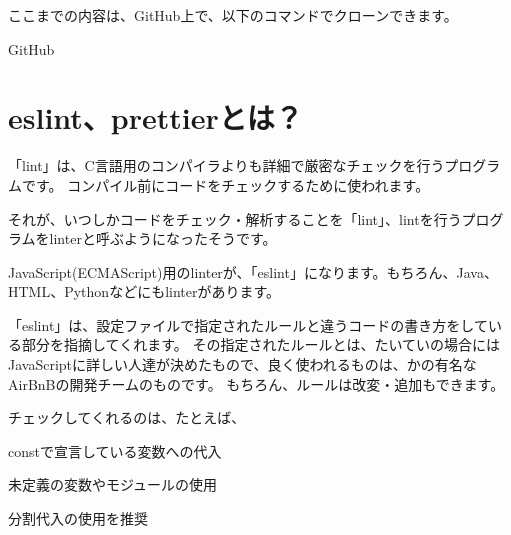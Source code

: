 \clearpage

\begin{starternote}[]{}

ここまでの内容は、GitHub上で、以下のコマンドでクローンできます。

\def\startercodeblockfontsize{}
\begin{starterterminal}[]{GitHub}\end{starterterminal}
\end{starternote}

\section{eslint、prettierとは？}
\keeplastskip{
  \label{sec:2-3}
  \label{sec-03lint}
  \par\nobreak
}

「lint」は、C言語用のコンパイラよりも詳細で厳密なチェックを行うプログラムです。
コンパイル前にコードをチェックするために使われます。

\vspace*{\baselineskip}

それが、いつしかコードをチェック・解析することを「lint」、lintを行うプログラムをlinterと呼ぶようになったそうです。

\vspace*{\baselineskip}

JavaScript(ECMAScript)用のlinterが、「eslint」になります。もちろん、Java、HTML、Pythonなどにもlinterがあります。

\vspace*{\baselineskip}

「eslint」は、設定ファイルで指定されたルールと違うコードの書き方をしている部分を指摘してくれます。
その指定されたルールとは、たいていの場合にはJavaScriptに詳しい人達が決めたもので、良く使われるものは、かの有名なAirBnBの開発チームのものです。
もちろん、ルールは改変・追加もできます。

\vspace*{\baselineskip}

チェックしてくれるのは、たとえば、

\begin{starteritemize}
\item constで宣言している変数への代入
\item 未定義の変数やモジュールの使用
\item 分割代入の使用を推奨
\end{starteritemize}

